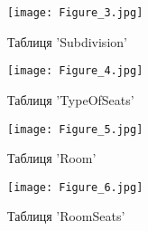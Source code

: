\documentclass[a4paper,12pt]{article}
\begin{document}
	\begin{figure}[h!]
		\centering
		\begin{minipage}[h]{1\linewidth}
			\texttt{[image: Figure\_3.jpg]}  
		\end{minipage}
		\caption{Таблиця 'Subdivision'}
	\end{figure}

\newpage
	
	\begin{figure}[h!]
		\centering
		\begin{minipage}[h]{1\linewidth}
			\texttt{[image: Figure\_4.jpg]}  
		\end{minipage}
		\caption{Таблиця 'TypeOfSeats'}
	\end{figure}
	
	\begin{figure}[h!]
		\centering
		\begin{minipage}[h]{1\linewidth}
			\texttt{[image: Figure\_5.jpg]}  
		\end{minipage}
		\caption{Таблиця 'Room'}
	\end{figure}
	
	\begin{figure}[h!]
		\centering
		\begin{minipage}[h]{1\linewidth}
			\texttt{[image: Figure\_6.jpg]}  
		\end{minipage}
		\caption{Таблиця 'RoomSeats'}
	\end{figure}
\end{document}
